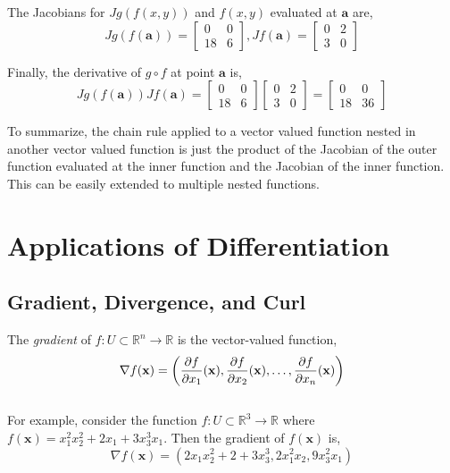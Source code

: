 \documentclass[12pt]{article}
\begin{document}
 The Jacobians for $Jg(f(x,y))$ and $f(x,y)$ evaluated at $\mathbf{a}$ are,
\[
Jg(f(\mathbf{a})) = 
\begin{bmatrix}
0 & 0 \\
18 & 6
\end{bmatrix}
,
Jf(\mathbf{a}) = 
\begin{bmatrix}
0 & 2 \\
3 & 0
\end{bmatrix}
\]

 Finally, the derivative of $g\circ f$ at point $\mathbf{a}$ is,
\[
Jg(f(\mathbf{a}))Jf(\mathbf{a}) = 
\begin{bmatrix}
0 & 0 \\
18 & 6
\end{bmatrix}
\begin{bmatrix}
0 & 2 \\
3 & 0
\end{bmatrix}
=
\begin{bmatrix}
0 & 0 \\
18 & 36
\end{bmatrix}
\]

To summarize, the chain rule applied to a vector valued function nested in another vector valued function is just the product of the Jacobian of the outer function evaluated at the inner function and the Jacobian of the inner function. This can be easily extended to multiple nested functions. \\ 

\pagebreak

\section{Applications of Differentiation}

\subsection{Gradient, Divergence, and Curl}

 The \emph{gradient} of $f:U\subset\mathbb{R}^n\rightarrow\mathbb{R}$ is the vector-valued function,
\[
\nabla f(\mathbf{x}) = \left( \frac{\partial f}{\partial x_1}(\mathbf{x}), \frac{\partial f}{\partial x_2}(\mathbf{x}), \ldots, \frac{\partial f}{\partial x_n}(\mathbf{x}) \right)
\] \\

 For example, consider the function $f:U\subset\mathbb{R}^3\rightarrow\mathbb{R}$ where $f(\mathbf{x}) = x_1^2x_2^2 + 2x_1 + 3x_3^3x_1$. Then the gradient of $f(\mathbf{x})$ is, 
\[
\nabla f(\mathbf{x}) = (2x_1x_2^2 + 2 + 3x_3^3, 2x_1^2x_2, 9x_3^2x_1)
\] \\
\end{document}
